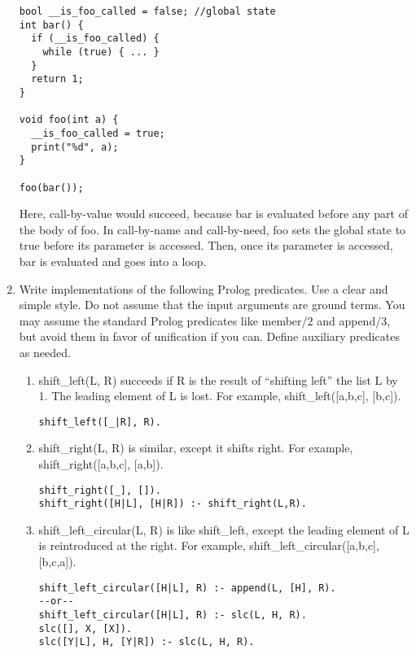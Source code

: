 \documentclass[10pt]{article}
\begin{document}
\begin{enumerate}
\begin{verbatim}
bool __is_foo_called = false; //global state
int bar() {
  if (__is_foo_called) {
    while (true) { ... }
  }
  return 1;
}

void foo(int a) {
  __is_foo_called = true;
  print("%d", a);
}

foo(bar());
\end{verbatim}

        Here, call-by-value would succeed, because bar is evaluated before any part of the body of foo. In call-by-name and call-by-need,
        foo sets the global state to true before its parameter is accessed. Then, once its parameter is accessed, bar is evaluated and goes
        into a loop.

        \item Write implementations of the following Prolog predicates. Use a clear and simple style. Do not assume that the input arguments are ground
        terms. You may assume the standard Prolog predicates like member/2 and append/3, but avoid them in favor of unification if you can. Define
        auxiliary predicates as needed.

        \begin{enumerate}
                \item shift\_left(L, R) succeeds if R is the result of ``shifting left'' the list L by 1.
                The leading element of L is lost. For example, shift\_left([a,b,c], [b,c]).\\

\begin{verbatim}
shift_left([_|R], R).
\end{verbatim}

                \item shift\_right(L, R) is similar, except it shifts right. For example, shift\_right([a,b,c], [a,b]).\\

\begin{verbatim}
shift_right([_], []).
shift_right([H|L], [H|R]) :- shift_right(L,R).
\end{verbatim}

                \item shift\_left\_circular(L, R) is like shift\_left, except the leading element of L is reintroduced at the right.
                For example, shift\_left\_circular([a,b,c], [b,c,a]).\\

\begin{verbatim}
shift_left_circular([H|L], R) :- append(L, [H], R).
--or--
shift_left_circular([H|L], R) :- slc(L, H, R).
slc([], X, [X]).
slc([Y|L], H, [Y|R]) :- slc(L, H, R).
\end{verbatim}


\end{enumerate}
\end{enumerate}
\end{document}
